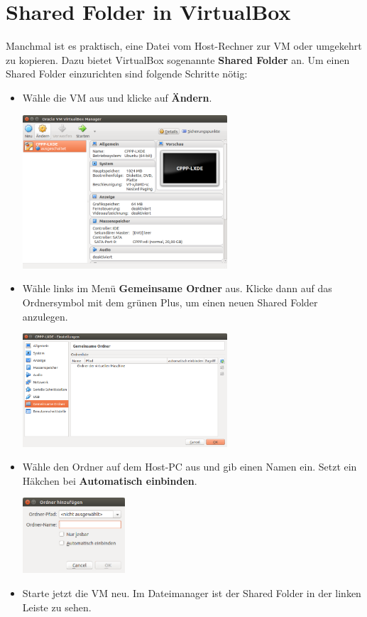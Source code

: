 \documentclass[
  accentcolor=tud1c,	%
  colorbacktitle,		%
  inverttitle,			%
  german,
  twoside
]{tudreport}
\begin{document}
\chapter{Shared Folder in VirtualBox}

Manchmal ist es praktisch, eine Datei vom Host-Rechner zur VM oder umgekehrt zu kopieren. Dazu bietet VirtualBox sogenannte \textbf{Shared Folder} an. Um einen Shared Folder einzurichten sind folgende Schritte nötig:

\begin{itemize}
\item Wähle die VM aus und klicke auf \textbf{Ändern}.
\begin{center}
	\includegraphics[width=0.6\textwidth]{figures/sf1.png}
\end{center}
\item Wähle links im Menü \textbf{Gemeinsame Ordner} aus. Klicke dann auf das Ordnersymbol mit dem grünen Plus, um einen neuen Shared Folder anzulegen.
\begin{center}
	\includegraphics[width=0.6\textwidth]{figures/sf2.png}
\end{center}
\item Wähle den Ordner auf dem Host-PC aus und gib einen Namen ein. Setzt ein Häkchen bei \textbf{Automatisch einbinden}.
\begin{center}
	\includegraphics[width=0.3\textwidth]{figures/sf3.png}
\end{center}
\item Starte jetzt die VM neu. Im Dateimanager ist der Shared Folder in der linken Leiste zu sehen.
\end{itemize}
\end{document}
